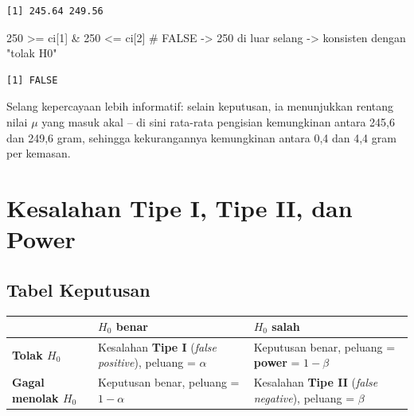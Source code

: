 \documentclass[
  indonesian,
  letterpaper,
]{book}
\newenvironment{Shaded}{\begin{snugshade}}{\end{snugshade}}
\newcommand{\CommentTok}[1]{\textcolor[rgb]{0.37,0.37,0.37}{#1}}
\newcommand{\DecValTok}[1]{\textcolor[rgb]{0.68,0.00,0.00}{#1}}
\newcommand{\NormalTok}[1]{\textcolor[rgb]{0.00,0.23,0.31}{#1}}
\newcommand{\SpecialCharTok}[1]{\textcolor[rgb]{0.37,0.37,0.37}{#1}}
\newcounter{none} %
\begin{document}
\begin{verbatim}
[1] 245.64 249.56
\end{verbatim}

\begin{Shaded}
\begin{Highlighting}[]
\DecValTok{250} \SpecialCharTok{\textgreater{}=}\NormalTok{ ci[}\DecValTok{1}\NormalTok{] }\SpecialCharTok{\&} \DecValTok{250} \SpecialCharTok{\textless{}=}\NormalTok{ ci[}\DecValTok{2}\NormalTok{]   }\CommentTok{\# FALSE {-}\textgreater{} 250 di luar selang {-}\textgreater{} konsisten dengan "tolak H0"}
\end{Highlighting}
\end{Shaded}

\begin{verbatim}
[1] FALSE
\end{verbatim}

Selang kepercayaan lebih informatif: selain keputusan, ia menunjukkan
rentang nilai \(\mu\) yang masuk akal -- di sini rata-rata pengisian
kemungkinan antara 245,6 dan 249,6 gram, sehingga kekurangannya
kemungkinan antara 0,4 dan 4,4 gram per kemasan.

\section{Kesalahan Tipe I, Tipe II, dan
Power}\label{kesalahan-tipe-i-tipe-ii-dan-power}

\subsection{Tabel Keputusan}\label{tabel-keputusan}

{\def\LTcaptype{none} %
\begin{longtable}[]{@{}
  >{\raggedright\arraybackslash}p{}
  >{\raggedright\arraybackslash}p{}
  >{\raggedright\arraybackslash}p{}@{}}
\toprule\noalign{}
\begin{minipage}[b]{\linewidth}\raggedright
\end{minipage} & \begin{minipage}[b]{\linewidth}\raggedright
\(H_0\) benar
\end{minipage} & \begin{minipage}[b]{\linewidth}\raggedright
\(H_0\) salah
\end{minipage} \\
\midrule\noalign{}
\endhead
\bottomrule\noalign{}
\endlastfoot
\textbf{Tolak \(H_0\)} & Kesalahan \textbf{Tipe I} (\emph{false
positive}), peluang = \(\alpha\) & Keputusan benar, peluang =
\textbf{power} = \(1-\beta\) \\
\textbf{Gagal menolak \(H_0\)} & Keputusan benar, peluang = \(1-\alpha\)
& Kesalahan \textbf{Tipe II} (\emph{false negative}), peluang =
\(\beta\) \\
\end{longtable}
}
\end{document}
